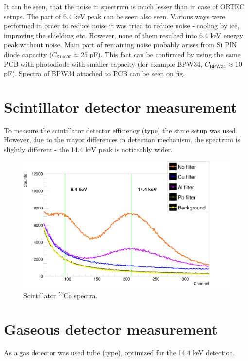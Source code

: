 It can be seen, that the noise in spectrum is much lesser than in case of ORTEC setups. The part of 6.4 keV peak can be seen also seen. Various ways were performed in order to reduce noise it was tried to reduce noise - cooling by ice, improving the shielding etc. However, none of them resulted into 6.4 keV energy peak without noise. Main part of remaining noise probably arises from Si PIN diode capacity ($C_{\textrm{S14605}} \approx 25$ pF). This fact can be confirmed by using the same PCB with photodiode with smaller capacity (for example BPW34, $C_{\textrm{BPW34}} \approx 10$ pF). Spectra of BPW34 attached to PCB can be seen on fig.



\section{Scintillator detector measurement}
To measure the scintillator detector efficiency (type) the same setup was used. However, due to the mayor differences in detection mechanism, the spectrum is slightly different - the 14.4 keV peak is noticeably wider.

\begin{figure}[H]
\centering
\includegraphics[scale=0.125, angle = 0]{./pictures/PMTSpectre.png}
\caption{Scintillator $^{57}$Co spectra.}
\label{Scintillator detector spectra.}
\end{figure}


\section{Gaseous detector measurement}
As a gas detector was used tube (type), optimized for the 14.4 keV detection.

